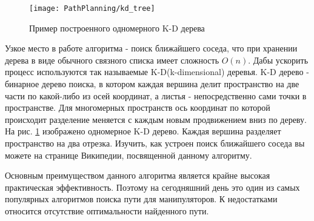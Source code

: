 \begin{figure}[h!]
	\centering
	\texttt{[image: PathPlanning/kd\_tree]}
	\caption{Пример построенного одномерного K-D дерева}
	\label{fig:4_2_1}
\end{figure}
Узкое место в работе алгоритма - поиск ближайшего соседа, что при хранении дерева в виде обычного связного списка имеет сложность $O(n)$. Дабы ускорить процесс используются так называемые K-D(k-dimensional) деревья. K-D дерево - бинарное дерево поиска, в котором каждая вершина делит пространство на две части по какой-либо из осей координат, а листья - непосредственно сами точки в пространстве. Для многомерных пространств ось координат по которой происходит разделение меняется с каждым новым продвижением вниз по дереву. На рис. \ref{fig:4_2_1} изображено одномерное K-D дерево. Каждая вершина разделяет пространство на два отрезка. Изучить, как устроен поиск ближайшего соседа вы можете на странице Википедии, посвященной данному алгоритму\cite{KDTree}.

Основным преимуществом данного алгоритма является крайне высокая практическая эффективность.\cite{RRTConnect} Поэтому на сегодняшний день это один из самых популярных алгоритмов поиска пути для манипуляторов. К недостатками относится отсутствие оптимальности найденного пути.